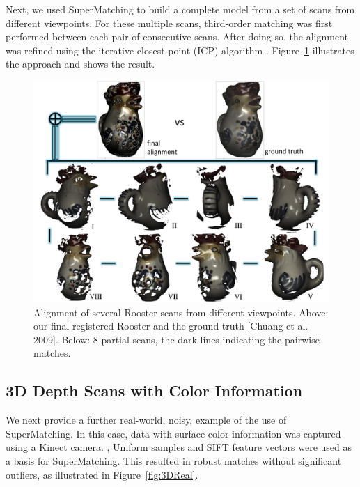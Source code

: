 Next, we used SuperMatching to build a complete model from a set of scans from different viewpoints.
For these multiple scans, third-order matching was first performed between each pair of consecutive scans.
After doing so, the alignment was refined using the iterative closest point (ICP) algorithm \cite{Besl92}.
Figure~\ref{fig:3DRigid} illustrates the approach and shows the result.

\begin{figure}[t!]
\centering
  \includegraphics[width=0.99\linewidth]{figures/Rooster.pdf}
  \caption{Alignment of several Rooster scans from different viewpoints.
  Above: our final registered Rooster and the ground truth [Chuang et al. 2009]. Below: 8 partial scans, the dark lines indicating the pairwise matches.}
\label{fig:3DRigid}
\end{figure}

\subsection{3D Depth Scans with Color Information}
\label{subsec:3dColored}

We next provide a further real-world, noisy, example of the use of SuperMatching.
In this case, data with surface color information was captured using a Kinect camera. \cite{Kinect12},
Uniform samples and SIFT feature vectors were used as a basis for SuperMatching.
This resulted in robust matches without significant outliers, as illustrated in Figure~\ref{fig:3DReal}.

